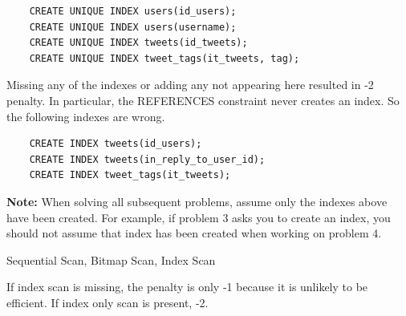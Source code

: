 \documentclass[12pt]{exam}
\theoremstyle{definition}
\begin{document}
\begin{questions}

\begin{solution}
    \begin{lstlisting}
    CREATE UNIQUE INDEX users(id_users);
    CREATE UNIQUE INDEX users(username);
    CREATE UNIQUE INDEX tweets(id_tweets);
    CREATE UNIQUE INDEX tweet_tags(it_tweets, tag);
    \end{lstlisting}
    Missing any of the indexes or adding any not appearing here resulted in -2 penalty.
    In particular, the REFERENCES constraint never creates an index.
    So the following indexes are wrong.
    \begin{lstlisting}
    CREATE INDEX tweets(id_users);
    CREATE INDEX tweets(in_reply_to_user_id);
    CREATE INDEX tweet_tags(it_tweets);
    \end{lstlisting}
\end{solution}

\vspace{3in}
    \textbf{Note:}
    When solving all subsequent problems,
    assume only the indexes above have been created.
    For example, if problem 3 asks you to create an index,
    you should not assume that index has been created when working on problem 4.

\newpage
{}

\begin{solution}
    Sequential Scan,
    Bitmap Scan,
    Index Scan

    If index scan is missing, the penalty is only -1 because it  is unlikely to be efficient.
    If index only scan is present, -2.

\end{solution}
\vspace{3in}

%
%


\end{questions}
\end{document}
